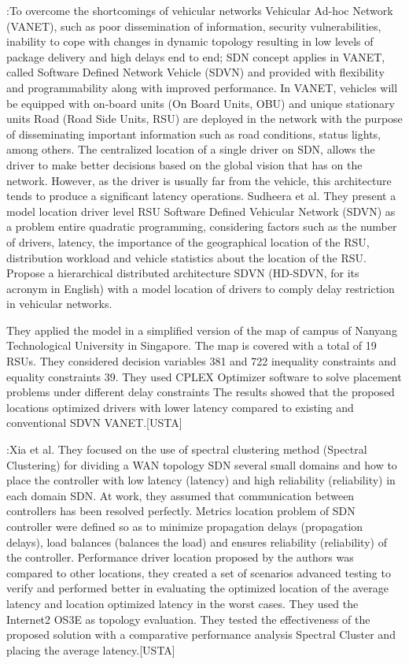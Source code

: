 \documentclass[a4paper,10pt]{article}
\begin{document}
\cite{SuMa18}:To overcome the shortcomings of vehicular networks Vehicular Ad-hoc Network (VANET), such as poor dissemination of information, security vulnerabilities, inability to cope with changes in dynamic topology resulting in low levels of package delivery and high delays end to end; SDN concept applies in VANET, called Software Defined Network Vehicle (SDVN) and provided with flexibility and programmability along with improved performance. In VANET, vehicles will be equipped with on-board units (On Board Units, OBU) and unique stationary units Road (Road Side Units, RSU) are deployed in the network with the purpose of disseminating important information such as road conditions, status lights, among others. The centralized location of a single driver on SDN, allows the driver to make better decisions based on the global vision that has on the network. However, as the driver is usually far from the vehicle, this architecture tends to produce a significant latency operations.
Sudheera et al. They present a model location driver level RSU Software Defined Vehicular Network (SDVN) as a problem entire quadratic programming, considering factors such as the number of drivers, latency, the importance of the geographical location of the RSU, distribution workload and vehicle statistics about the location of the RSU. Propose a hierarchical distributed architecture SDVN (HD-SDVN, for its acronym in English) with a model location of drivers to comply delay restriction in vehicular networks.
 
 
They applied the model in a simplified version of the map of campus of Nanyang Technological University in Singapore. The map is covered with a total of 19 RSUs. They considered decision variables 381 and 722 inequality constraints and equality constraints 39. They used CPLEX Optimizer software to solve placement problems under different delay constraints
The results showed that the proposed locations optimized drivers with lower latency compared to existing and conventional SDVN VANET.[USTA]








\cite{XiQu14}:Xia et al. They focused on the use of spectral clustering method (Spectral Clustering) for dividing a WAN topology SDN several small domains and how to place the controller with low latency (latency) and high reliability (reliability) in each domain SDN. At work, they assumed that communication between controllers has been resolved perfectly. Metrics location problem of SDN controller were defined so as to minimize propagation delays (propagation delays), load balances (balances the load) and ensures reliability (reliability) of the controller.
Performance driver location proposed by the authors was compared to other locations, they created a set of scenarios advanced testing to verify and performed better in evaluating the optimized location of the average latency and location optimized latency in the worst cases. They used the Internet2 OS3E as topology evaluation.
They tested the effectiveness of the proposed solution with a comparative performance analysis Spectral Cluster and placing the average latency.[USTA]
\end{document}
